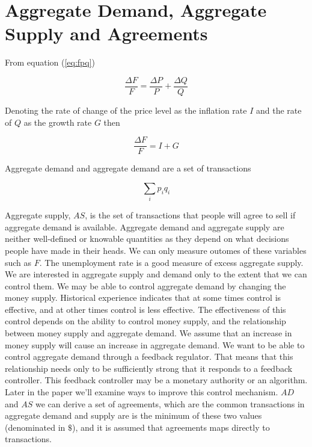 \section{Aggregate Demand, Aggregate Supply and Agreements}

From equation (\ref{eq:fpq})

\[ \frac {\Delta F} F = \frac {\Delta P} P + \frac {\Delta Q} Q \]

Denoting the rate of change of the price level as the inflation rate $I$ and the rate of $Q$ as the
growth rate $G$ then

\begin{equation}
    \label{equation:fig}
    \frac {\Delta F} F = I + G
\end{equation}

Aggregate demand and aggregate demand are a set of transactions

\begin{equation}
    \sum_i p_i q_i
\end{equation}

Aggregate supply, $AS$, is the set of transactions that people will agree to sell if aggregate
demand is available. Aggregate demand and aggregate supply are neither well-defined or knowable
quantities as they depend on what decisions people have made in their heads. We can only measure
outomes of these variables such as $F$. The unemployment rate is a good measure of excess aggregate
supply. We are interested in aggregate supply and demand only to the extent that we can control
them. We may be able to control aggregate demand by changing the money supply. Historical experience
indicates that at some times control is effective, and at other times control is less effective. The
effectiveness of this control depends on the ability to control money supply, and the relationship
between money supply and aggregate demand.  We assume that an increase in money supply will cause an
increase in aggregate demand. We want to be able to control aggregate demand through a feedback
regulator. That means that this relationship needs only to be sufficiently strong that it responds
to a feedback controller. This feedback controller may be a monetary authority or an algorithm.
Later in the paper we'll examine ways to improve this control mechanism. $AD$ and $AS$ we can derive
a set of agreements, which are the common transactions in aggregate demand and supply are is the
minimum of these two values (denominated in $\$$), and it is assumed that agreements maps directly
to transactions.


